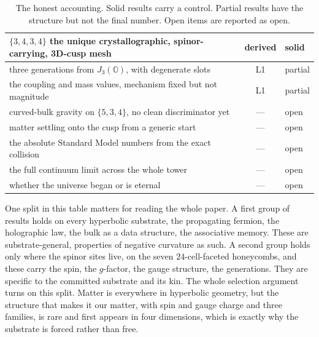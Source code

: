 \begin{table}[ht]
\begin{tabular}{@{}p{}cl@{}}
$\{3,4,3,4\}$ the unique crystallographic, spinor-carrying, 3D-cusp mesh & derived & solid \\
\midrule
three generations from $J_3(\mathbb{O})$, with degenerate slots & L1 & partial \\
the coupling and mass values, mechanism fixed but not magnitude & L1 & partial \\
\midrule
curved-bulk gravity on $\{5,3,4\}$, no clean discriminator yet & --- & open \\
matter settling onto the cusp from a generic start & --- & open \\
the absolute Standard Model numbers from the exact collision & --- & open \\
the full continuum limit across the whole tower & --- & open \\
whether the universe began or is eternal & --- & open \\
\bottomrule
\end{tabular}
\caption{The honest accounting. Solid results carry a control. Partial results have the structure but not the final number. Open items are reported as open.}
\label{tab:scoreboard}
\end{table}

One split in this table matters for reading the whole paper. A first group of results holds on every hyperbolic substrate, the propagating fermion, the holographic law, the bulk as a data structure, the associative memory. These are substrate-general, properties of negative curvature as such. A second group holds only where the spinor sites live, on the seven $24$-cell-faceted honeycombs, and these carry the spin, the $g$-factor, the gauge structure, the generations. They are specific to the committed substrate and its kin. The whole selection argument turns on this split. Matter is everywhere in hyperbolic geometry, but the structure that makes it our matter, with spin and gauge charge and three families, is rare and first appears in four dimensions, which is exactly why the substrate is forced rather than free.
